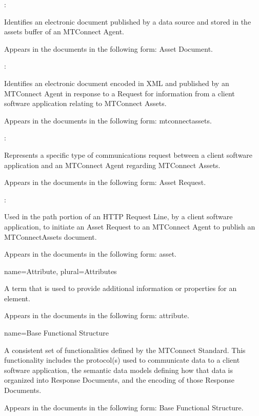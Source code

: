 {  :

  Identifies an electronic document published by a data source and stored in the assets buffer of an MTConnect Agent.
  
  Appears in the documents in the following form: Asset Document.
  
  :

  Identifies an electronic document encoded in XML and published by an MTConnect Agent in response to a Request for information from a client software application relating to MTConnect Assets.

  Appears in the documents in the following form: \glspl{mtconnectasset}.

  :

  Represents a specific type of communications request between a client software application and an MTConnect Agent regarding MTConnect Assets.

  Appears in the documents in the following form: Asset Request.

  :

  Used in the path portion of an HTTP Request Line, by a client software application, to initiate an Asset Request to an MTConnect Agent to publish an MTConnectAssets document.

  Appears in the documents in the following form: asset.
}


{
  name={Attribute},
  plural={Attributes}
}
{
  A term that is used to provide additional information or properties for an element.

  Appears in the documents in the following form: attribute.
}


{
  name={Base Functional Structure}
}
{
  A consistent set of functionalities defined by the MTConnect Standard. This functionality includes the protocol(s) used to communicate data to a client software application, the semantic data models defining how that data is organized into Response Documents, and the encoding of those Response Documents.

  Appears in the documents in the following form: Base Functional Structure.
}

